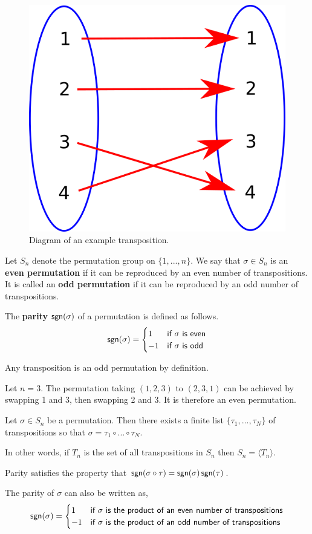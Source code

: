 \begin{figure}[h]
    \centering
    \includegraphics[width=0.5\linewidth]{transposition.png}
    \caption{Diagram of an example transposition.}
    \label{fig:transposition}
\end{figure}

\begin{defn}
    Let $S_n$ denote the permutation group on $\{1,...,n\}$. We say that $\sigma \in S_n$ is an \textbf{even permutation} if it can be reproduced by an even number of transpositions. It is called an \textbf{odd permutation} if it can be reproduced by an odd number of transpositions.
    
    The \textbf{parity} $\operatorname{\textsf{sgn}}(\sigma)$ of a permutation is defined as follows.
    \[\operatorname{\textsf{sgn}}(\sigma) = \begin{cases}1 &\textsf{if } \sigma \textsf{ is even}\\
    -1 & \textsf{if } \sigma \textsf{ is odd}\end{cases}\]
\end{defn}
\begin{example}
    Any transposition is an odd permutation by definition.
\end{example}
\begin{example}
Let $n=3$. The permutation taking $(1,2,3)$ to $(2,3,1)$ can be achieved by swapping 1 and 3, then swapping 2 and 3. It is therefore an even permutation.
\end{example}
\begin{thm}
    Let $\sigma\in S_n$ be a permutation. Then there exists a finite list $\{\tau_1,...,\tau_N\}$ of transpositions so that $\sigma = \tau_1\circ...\circ \tau_N$. 

    In other words, if $T_n$ is the set of all transpositions in $S_n$ then $S_n = \langle T_n\rangle$.
\end{thm}
\begin{thm}
Parity satisfies the property that $\operatorname{\textsf{sgn}}(\sigma\circ\tau) = \operatorname{\textsf{sgn}}(\sigma)\operatorname{\textsf{sgn}}(\tau)$.
\end{thm}
\begin{cor}
    The parity of $\sigma$ can also be written as,
    \[\operatorname{\textsf{sgn}}(\sigma) = \begin{cases}1 &\textsf{if } \sigma \textsf{ is the product of an even number of transpositions}\\
    -1 & \textsf{if } \sigma \textsf{ is the product of an odd number of transpositions}\end{cases}\]
\end{cor}

